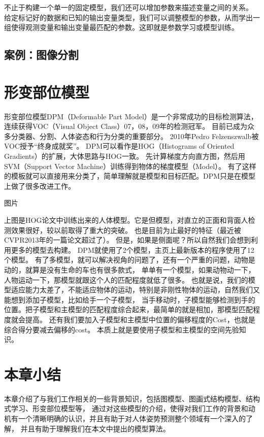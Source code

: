 不止于构建一个单一的固定模型，我们还可以增加参数来描述变量之间的关系。
给定标记好的数据和已知的输出变量类型，我们可以调整模型的参数，从而学出一组使得观测变量和输出变量最匹配的参数。这即就是参数学习或模型训练。

\subsection{案例：图像分割}
\cite{http://www.nowozin.net/sebastian/papers/nowozin2011structured-tutorial.pdf}


\section{形变部位模型}
\cite{lsvm}
形变部位模型DPM（Deformable Part Model）是一个非常成功的目标检测算法，
连续获得VOC（Visual Object Class）07，08，09年的检测冠军。
目前已成为众多分类器、分割、人体姿态和行为分类的重要部分。
2010年Pedro Felzenszwalb被VOC授予“终身成就奖”。
DPM可以看作是HOG（Histograms of Oriented Gradients）的扩展，大体思路与HOG一致。
先计算梯度方向直方图，然后用SVM（Support Vector Machine）训练得到物体的梯度模型（Model）。
有了这样的模板就可以直接用来分类了，简单理解就是模型和目标匹配。DPM只是在模型上做了很多改进工作。

图片

上图是HOG论文中训练出来的人体模型。它是但模型，对直立的正面和背面人检测效果很好，较以前取得了重大的突破。
也是目前为止最好的特征（最近被CVPR2013年的一篇论文\cite{Histograms of Sparse Codes for Object Detection}超过了）。
但是，如果是侧面呢？所以自然我们会想到利用更多的模型去构建。
DPM就使用了2个模型，主页上最新版本的程序使用了12个模型。
有了多模型，就可以解决视角的问题了，还有一个严重的问题，动物是动的，就算是没有生命的车也有很多款式，
单单有一个模型，如果动物动一下，人物运动一下，那模型就跟这个人的匹配程度就低了很多。
也就是说，我们的模型适应能力太差了，不能适应物体的运动，特别是非刚性物体的运动，自然我们又能想到添加子模型，比如给手一个子模型，
当手移动时，子模型能够检测到手的位置。把子模型和主模型的匹配程度综合起来，最简单的就是相加，那模型匹配程度就会提高。
还有我们要加入子模型和主模型中位置的偏移程度的Cost，也就是综合得分要减去偏移的cost。
本质上就是要使用子模型和主模型的空间先验知识。


\section{本章小结}
本章介绍了与我们工作相关的一些背景知识，包括图模型、图画式结构模型、结构式学习、形变部位模型等，
通过对这些模型的介绍，使得对我们工作的背景和动机有一个清晰明确的认识，并且有助于对人体姿势预测整个领域有一个深入的了解，
并且有助于理解我们在本文中提出的模型算法。
